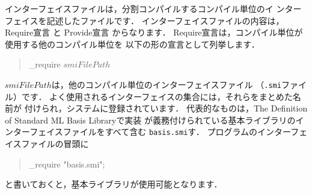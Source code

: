 \documentclass{jbook}
\newenvironment{program}{\begin{tt}\begin{quote}}{\end{quote}\end{tt}}
\begin{document}
\ifx\jp%
	インターフェイスファイルは，分割コンパイルするコンパイル単位のイ
ンターフェイスを記述したファイルです．
	インターフェイスファイルの内容は，
Require宣言
と
Provide宣言
からなります．
	Require宣言は，コンパイル単位が使用する他のコンパイル単位を
以下の形の宣言として列挙します．
\begin{program}
\_require $smiFilePath$
\end{program}
	$smiFilePath$は，他のコンパイル単位のインターフェイスファイル
（{\tt .smi}ファイル）です．
	よく使用されるインターフェイスの集合には，それらをまとめた名前が
付けられ，システムに登録されています．
	代表的なものは，The Definition of Standard ML Basis Libraryで実装
が義務付けられている基本ライブラリのインターフェイスファイルをすべて含む
{\tt basis.smi}す．
	プログラムのインターフェイスファイルの冒頭に
\begin{program}
\_require "basis.smi";
\end{program}
と書いておくと，基本ライブラリが使用可能となります．
\end{document}
